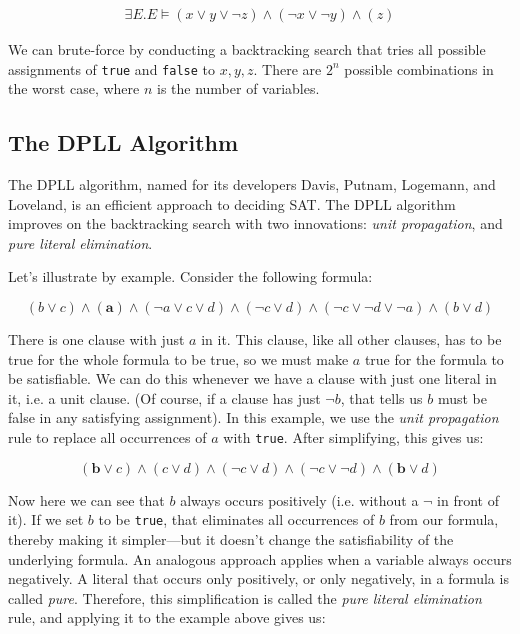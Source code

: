 \documentclass[11pt]{article}
\begin{document}
\[
\begin{array}{c}
\exists E . E \vDash (x \lor y \lor \lnot z) \land (\lnot x \lor \lnot y) \land (z)
\end{array}
\]

We can brute-force by conducting a backtracking search that tries all possible
assignments of \texttt{true} and \texttt{false} to $x, y, z$. There are $2^n$
possible combinations in the worst case, where $n$ is the number of variables.

\subsection{The DPLL Algorithm}

The DPLL algorithm, named for its developers Davis, Putnam, Logemann, and
Loveland, is an efficient approach to deciding SAT. The DPLL algorithm improves
on the backtracking search with two innovations: \emph{unit propagation}, and
\emph{pure literal elimination}.  

Let's illustrate by example. Consider the following formula:

\[
(b \lor c) \land (\mathbf{a}) \land (\lnot a \lor c \lor d) \land (\lnot c \lor d) \land (\lnot c \lor \lnot d \lor \lnot a) \land (b \lor d)
\]

There is one clause with just $a$ in it. This clause, like all other clauses,
has to be true for the whole formula to be true, so we must make $a$ true for
the formula to be satisfiable. We can do this whenever we have a clause with
just one literal in it, i.e. a unit clause. (Of course, if a clause has just
$\lnot b$, that tells us $b$ must be false in any satisfying assignment). In
this example, we use the \textit{unit propagation} rule to replace all
occurrences of $a$ with \texttt{true}. After simplifying, this gives us:

\[
(\mathbf{b} \lor c) \land (c \lor d) \land (\lnot c \lor d) \land (\lnot c \lor \lnot d) \land (\mathbf{b} \lor d)
\]

Now here we can see that $b$ always occurs positively (i.e. without a $\lnot$ in
front of it). If we set $b$ to be \texttt{true}, that eliminates
all occurrences of $b$ from our formula, thereby making it simpler---but it
doesn't change the satisfiability of the underlying formula. An analogous
approach applies when a variable always occurs negatively. 
A literal that occurs only positively, or only negatively, in a
formula is called \textit{pure}. Therefore, this simplification is called the
\textit{pure literal elimination} rule, and applying it to the example above
gives us:
\end{document}
